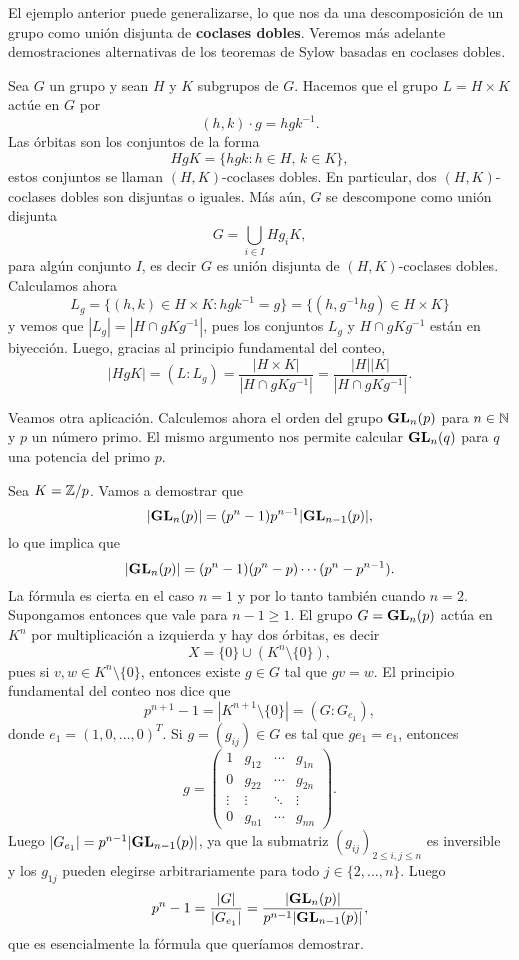 El ejemplo anterior puede generalizarse, lo que nos da una descomposición 
de un grupo como unión disjunta de \textbf{coclases dobles}. Veremos más adelante
demostraciones alternativas de los teoremas de Sylow basadas en 
coclases dobles.

\begin{example}
Sea $G$ un grupo y sean $H$ y $K$ subgrupos de $G$. Hacemos
que el grupo $L=H\times K$ actúe en $G$ por
\[
(h,k)\cdot g=hgk^{-1}.
\]
Las órbitas son los conjuntos de la forma
\[
HgK=\{hgk:h\in H,\,k\in K\},
\]
estos conjuntos se llaman $(H,K)$-coclases dobles. 
En particular, dos $(H,K)$-coclases dobles son disjuntas o iguales. Más aún, 
$G$ se descompone como unión disjunta 
\[
G=\bigcup_{i\in I}Hg_iK,
\]
para algún conjunto $I$, es decir $G$ 
es unión disjunta de $(H,K)$-coclases dobles. 
Calculamos ahora 
\[
L_g=\{(h,k)\in H\times K:hgk^{-1}=g\}=\{(h,g^{-1}hg)\in H\times K\}
\]
y vemos que $|L_g|=|H\cap gKg^{-1}|$, pues los conjuntos $L_g$ y $H\cap gKg^{-1}$ están en biyección. 
Luego, 
gracias al principio fundamental del conteo, 
\[
|HgK|=(L:L_g)=\frac{|H\times K|}{|H\cap gKg^{-1}|}=\frac{|H||K|}{|H\cap gKg^{-1}|}.
\]
\end{example}

Veamos otra aplicación. 
Calculemos ahora el orden del grupo $\mathbf{GL}_n(p)$ para $n\in\mathbb{N}$ y $p$ un número primo. El mismo argumento
nos permite calcular $\mathbf{GL}_n(q)$ para $q$ una potencia del primo $p$. 

\begin{example}
Sea $K=\mathbb{Z}/p$. 
Vamos a demostrar que 
\[
|\mathbf{GL}_n(p)|=(p^n-1)p^{n-1}|\mathbf{GL}_{n-1}(p)|,
\]
lo que implica que
\[
|\mathbf{GL}_n(p)|=(p^n-1)(p^n-p)\cdots (p^n-p^{n-1}).
\]
La fórmula es cierta en el caso $n=1$ y por lo tanto también cuando $n=2$. Supongamos
entonces que vale para $n-1\geq1$. 
El grupo $G=\mathbf{GL}_{n}(p)$ actúa en $K^{n}$ por multiplicación a izquierda y hay dos órbitas, es decir
\[
X=\{0\}\cup (K^{n}\setminus\{0\}),
\]
pues si $v,w\in K^{n}\setminus\{0\}$, entonces existe $g\in G$ tal que $gv=w$. 
El principio 
fundamental del conteo nos dice que
\[
p^{n+1}-1=|K^{n+1}\setminus\{0\}|=(G:G_{e_1}),
\]
donde $e_1=(1,0,\dots,0)^T$. Si $g=(g_{ij})\in G$ es tal que $ge_1=e_1$, entonces 
\[
g=
\begin{pmatrix}
1 & g_{12} & \cdots & g_{1n}\\
0 & g_{22} & \cdots & g_{2n}\\
\vdots & \vdots & \ddots &\vdots\\
0 & g_{n1} & \cdots & g_{nn}	
\end{pmatrix}.
\]
Luego $|G_{e_1}|=p^{n-1}|\mathbf{GL}_{n-1}(p)|$, ya que la submatriz
$(g_{ij})_{2\leq i,j\leq n}$ es inversible y los 
$g_{1j}$ pueden elegirse arbitrariamente para todo $j\in\{2,\dots,n\}$. 
Luego
\[
p^{n}-1=\frac{|G|}{|G_{e_1}|}=\frac{|\mathbf{GL}_n(p)|}{p^{n-1}|\mathbf{GL}_{n-1}(p)|},
\]
que es esencialmente la fórmula que queríamos demostrar.
\end{example}



